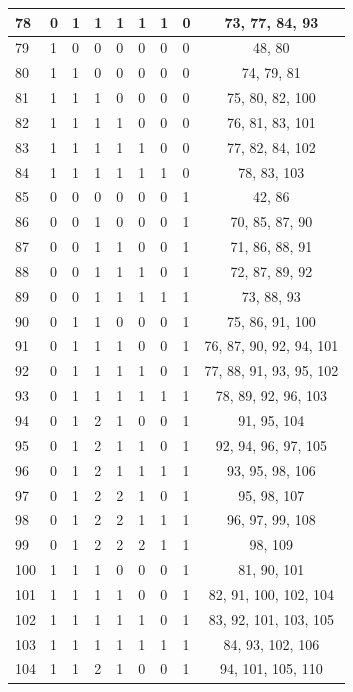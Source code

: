 \begin{longtable}{|l|l|l|l|l|l|l|l|c|}
78 & 0 & 1 & 1 & 1 & 1 & 1 & 0 & 73, 77, 84, 93 \\ \hline
79 & 1 & 0 & 0 & 0 & 0 & 0 & 0 & 48, 80 \\ \hline
80 & 1 & 1 & 0 & 0 & 0 & 0 & 0 & 74, 79, 81 \\ \hline
81 & 1 & 1 & 1 & 0 & 0 & 0 & 0 & 75, 80, 82, 100 \\ \hline
82 & 1 & 1 & 1 & 1 & 0 & 0 & 0 & 76, 81, 83, 101 \\ \hline
83 & 1 & 1 & 1 & 1 & 1 & 0 & 0 & 77, 82, 84, 102 \\ \hline
84 & 1 & 1 & 1 & 1 & 1 & 1 & 0 & 78, 83, 103 \\ \hline
85 & 0 & 0 & 0 & 0 & 0 & 0 & 1 & 42, 86 \\ \hline
86 & 0 & 0 & 1 & 0 & 0 & 0 & 1 & 70, 85, 87, 90 \\ \hline
87 & 0 & 0 & 1 & 1 & 0 & 0 & 1 & 71, 86, 88, 91 \\ \hline
88 & 0 & 0 & 1 & 1 & 1 & 0 & 1 & 72, 87, 89, 92 \\ \hline
89 & 0 & 0 & 1 & 1 & 1 & 1 & 1 & 73, 88, 93 \\ \hline
90 & 0 & 1 & 1 & 0 & 0 & 0 & 1 & 75, 86, 91, 100 \\ \hline
91 & 0 & 1 & 1 & 1 & 0 & 0 & 1 & 76, 87, 90, 92, 94, 101 \\ \hline
92 & 0 & 1 & 1 & 1 & 1 & 0 & 1 & 77, 88, 91, 93, 95, 102 \\ \hline
93 & 0 & 1 & 1 & 1 & 1 & 1 & 1 & 78, 89, 92, 96, 103 \\ \hline
94 & 0 & 1 & 2 & 1 & 0 & 0 & 1 & 91, 95, 104 \\ \hline
95 & 0 & 1 & 2 & 1 & 1 & 0 & 1 & 92, 94, 96, 97, 105 \\ \hline
96 & 0 & 1 & 2 & 1 & 1 & 1 & 1 & 93, 95, 98, 106 \\ \hline
97 & 0 & 1 & 2 & 2 & 1 & 0 & 1 & 95, 98, 107 \\ \hline
98 & 0 & 1 & 2 & 2 & 1 & 1 & 1 & 96, 97, 99, 108 \\ \hline
99 & 0 & 1 & 2 & 2 & 2 & 1 & 1 & 98, 109 \\ \hline
100 & 1 & 1 & 1 & 0 & 0 & 0 & 1 & 81, 90, 101 \\ \hline
101 & 1 & 1 & 1 & 1 & 0 & 0 & 1 & 82, 91, 100, 102, 104 \\ \hline
102 & 1 & 1 & 1 & 1 & 1 & 0 & 1 & 83, 92, 101, 103, 105 \\ \hline
103 & 1 & 1 & 1 & 1 & 1 & 1 & 1 & 84, 93, 102, 106 \\ \hline
104 & 1 & 1 & 2 & 1 & 0 & 0 & 1 & 94, 101, 105, 110 \\ \hline

\end{longtable}
